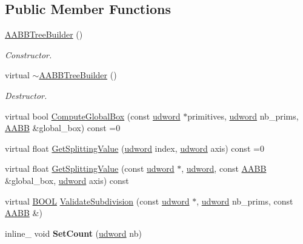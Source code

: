 \subsection*{Public Member Functions}
\begin{DoxyCompactItemize}
\item 
\hyperlink{classAABBTreeBuilder_a892c7e33c261342a6eee3f41e8f4f014}{A\+A\+B\+B\+Tree\+Builder} ()\hypertarget{classAABBTreeBuilder_a892c7e33c261342a6eee3f41e8f4f014}{}\label{classAABBTreeBuilder_a892c7e33c261342a6eee3f41e8f4f014}

\begin{DoxyCompactList}\small\item\em Constructor. \end{DoxyCompactList}\item 
virtual \hyperlink{classAABBTreeBuilder_a0ad3a7a7585ea8f917a4c9d807bab481}{$\sim$\+A\+A\+B\+B\+Tree\+Builder} ()\hypertarget{classAABBTreeBuilder_a0ad3a7a7585ea8f917a4c9d807bab481}{}\label{classAABBTreeBuilder_a0ad3a7a7585ea8f917a4c9d807bab481}

\begin{DoxyCompactList}\small\item\em Destructor. \end{DoxyCompactList}\item 
virtual bool \hyperlink{classAABBTreeBuilder_adde85a9974ea5dc2c74fd851e11abf75}{Compute\+Global\+Box} (const \hyperlink{IceTypes_8h_a44c6f1920ba5551225fb534f9d1a1733}{udword} $\ast$primitives, \hyperlink{IceTypes_8h_a44c6f1920ba5551225fb534f9d1a1733}{udword} nb\+\_\+prims, \hyperlink{classAABB}{A\+A\+BB} \&global\+\_\+box) const =0
\item 
virtual float \hyperlink{classAABBTreeBuilder_acf08d2d4275763e25585aa240e641be1}{Get\+Splitting\+Value} (\hyperlink{IceTypes_8h_a44c6f1920ba5551225fb534f9d1a1733}{udword} index, \hyperlink{IceTypes_8h_a44c6f1920ba5551225fb534f9d1a1733}{udword} axis) const =0
\item 
virtual float \hyperlink{classAABBTreeBuilder_ad22a318124c28d38de4a1a3a940d43c7}{Get\+Splitting\+Value} (const \hyperlink{IceTypes_8h_a44c6f1920ba5551225fb534f9d1a1733}{udword} $\ast$, \hyperlink{IceTypes_8h_a44c6f1920ba5551225fb534f9d1a1733}{udword}, const \hyperlink{classAABB}{A\+A\+BB} \&global\+\_\+box, \hyperlink{IceTypes_8h_a44c6f1920ba5551225fb534f9d1a1733}{udword} axis) const 
\item 
virtual \hyperlink{IceTypes_8h_a050c65e107f0c828f856a231f4b4e788}{B\+O\+OL} \hyperlink{classAABBTreeBuilder_ae04410f2d64c81d1cad6d5e7e4152858}{Validate\+Subdivision} (const \hyperlink{IceTypes_8h_a44c6f1920ba5551225fb534f9d1a1733}{udword} $\ast$, \hyperlink{IceTypes_8h_a44c6f1920ba5551225fb534f9d1a1733}{udword} nb\+\_\+prims, const \hyperlink{classAABB}{A\+A\+BB} \&)
\item 
inline\+\_\+ void {\bfseries Set\+Count} (\hyperlink{IceTypes_8h_a44c6f1920ba5551225fb534f9d1a1733}{udword} nb)\hypertarget{classAABBTreeBuilder_a47983eff336e89e78e452a8683a5e4d7}{}\label{classAABBTreeBuilder_a47983eff336e89e78e452a8683a5e4d7}


\end{DoxyCompactItemize}

